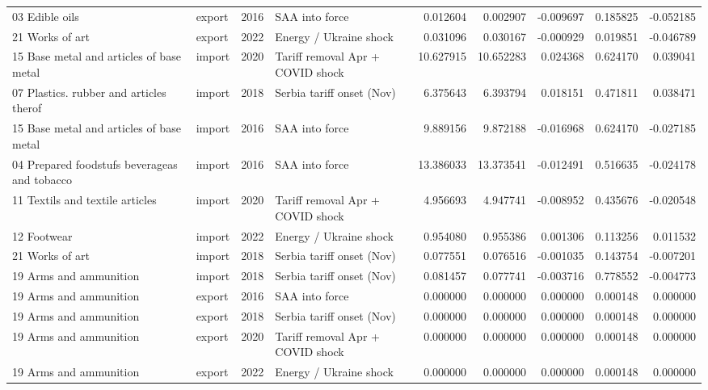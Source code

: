 \begin{tabular}{llrlrrrrr}
03 Edible oils & export & 2016 & SAA into force & 0.012604 & 0.002907 & -0.009697 & 0.185825 & -0.052185 \\
21 Works of art & export & 2022 & Energy / Ukraine shock & 0.031096 & 0.030167 & -0.000929 & 0.019851 & -0.046789 \\
15 Base metal and articles of base metal & import & 2020 & Tariff removal Apr + COVID shock & 10.627915 & 10.652283 & 0.024368 & 0.624170 & 0.039041 \\
07 Plastics. rubber and articles therof & import & 2018 & Serbia tariff onset (Nov) & 6.375643 & 6.393794 & 0.018151 & 0.471811 & 0.038471 \\
15 Base metal and articles of base metal & import & 2016 & SAA into force & 9.889156 & 9.872188 & -0.016968 & 0.624170 & -0.027185 \\
04 Prepared foodstufs beverageas and tobacco & import & 2016 & SAA into force & 13.386033 & 13.373541 & -0.012491 & 0.516635 & -0.024178 \\
11 Textils and textile articles & import & 2020 & Tariff removal Apr + COVID shock & 4.956693 & 4.947741 & -0.008952 & 0.435676 & -0.020548 \\
12 Footwear & import & 2022 & Energy / Ukraine shock & 0.954080 & 0.955386 & 0.001306 & 0.113256 & 0.011532 \\
21 Works of art & import & 2018 & Serbia tariff onset (Nov) & 0.077551 & 0.076516 & -0.001035 & 0.143754 & -0.007201 \\
19 Arms and ammunition & import & 2018 & Serbia tariff onset (Nov) & 0.081457 & 0.077741 & -0.003716 & 0.778552 & -0.004773 \\
19 Arms and ammunition & export & 2016 & SAA into force & 0.000000 & 0.000000 & 0.000000 & 0.000148 & 0.000000 \\
19 Arms and ammunition & export & 2018 & Serbia tariff onset (Nov) & 0.000000 & 0.000000 & 0.000000 & 0.000148 & 0.000000 \\
19 Arms and ammunition & export & 2020 & Tariff removal Apr + COVID shock & 0.000000 & 0.000000 & 0.000000 & 0.000148 & 0.000000 \\
19 Arms and ammunition & export & 2022 & Energy / Ukraine shock & 0.000000 & 0.000000 & 0.000000 & 0.000148 & 0.000000 \\
\bottomrule
\end{tabular}
